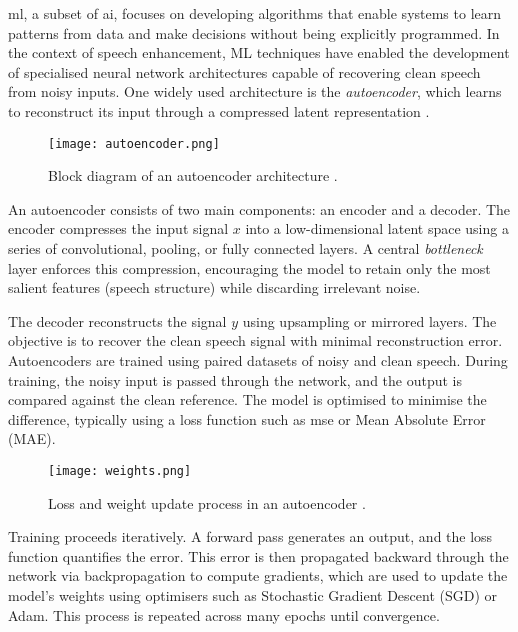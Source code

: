 \gls{ml}, a subset of \gls{ai}, focuses on developing algorithms that enable systems to learn patterns from data and make decisions without being explicitly programmed. In the context of speech enhancement, ML techniques have enabled the development of specialised neural network architectures capable of recovering clean speech from noisy inputs. One widely used architecture is the \textit{autoencoder}, which learns to reconstruct its input through a compressed latent representation \cite{azarang2020review}.

\begin{figure}[h]
    \centering
    \texttt{[image: autoencoder.png]}
    \caption{\label{fig:autoencoder} Block diagram of an autoencoder architecture \cite{vachhani2017dae}.}
\end{figure}

An autoencoder consists of two main components: an encoder and a decoder. The encoder compresses the input signal \(x\) into a low-dimensional latent space using a series of convolutional, pooling, or fully connected layers. A central \textit{bottleneck} layer enforces this compression, encouraging the model to retain only the most salient features (speech structure) while discarding irrelevant noise.

The decoder reconstructs the signal \(y\) using upsampling or mirrored layers. The objective is to recover the clean speech signal with minimal reconstruction error. Autoencoders are trained using paired datasets of noisy and clean speech. During training, the noisy input is passed through the network, and the output is compared against the clean reference. The model is optimised to minimise the difference, typically using a loss function such as \gls{mse} or Mean Absolute Error (MAE).

\begin{figure}[h]
    \centering
    \texttt{[image: weights.png]}
    \caption{\label{fig:weigths} Loss and weight update process in an autoencoder \cite{epoch2021}.}
\end{figure}

Training proceeds iteratively. A forward pass generates an output, and the loss function quantifies the error. This error is then propagated backward through the network via backpropagation to compute gradients, which are used to update the model’s weights using optimisers such as Stochastic Gradient Descent (SGD) or Adam. This process is repeated across many epochs until convergence.


